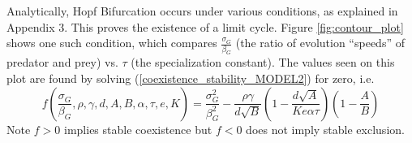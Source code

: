 \documentclass{amsart}
\theoremstyle{definition}
\theoremstyle{remark}
\numberwithin{equation}{section}
\begin{document}
Analytically, Hopf Bifurcation occurs under various conditions, as explained in Appendix 3.  This proves the existence of a limit cycle.  Figure \ref{fig:contour_plot} shows one such condition, which compares $\frac{\sigma_G}{\beta_G}$ (the ratio of evolution ``speeds'' of predator and prey) vs. $\tau$ (the specialization constant).  The values seen on this plot are found by solving (\ref{coexistence_stability_MODEL2}) for zero, i.e.
\begin{equation}
	f\left(\frac{\sigma_G}{\beta_G}, \rho, \gamma, d, A, B, \alpha, \tau, e, K\right) = \frac{\sigma_G^2}{\beta_G^2} - \frac{\rho\gamma}{d\sqrt{B}}\left(1 - \frac{d\sqrt{A}}{Ke\alpha\tau}\right)\left(1 - \frac{A}{B}\right)
\end{equation}
Note $f > 0$ implies stable coexistence but $f < 0$ does not imply stable exclusion.
\end{document}

